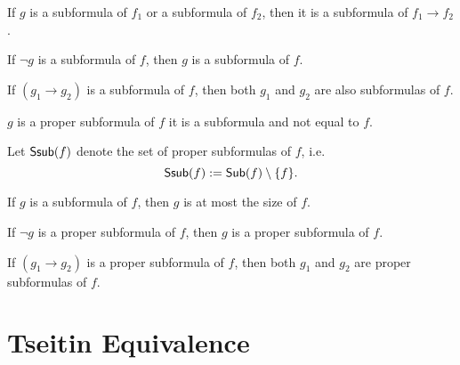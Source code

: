 \begin{lemma}
    \label{sub_imp}
    \leanok
    If $g$ is a subformula of $f_1$ or a subformula of $f_2$, then it is a subformula of $f_1 \to f_2$.
\end{lemma}

\begin{lemma}
    \label{neg_sub}
    If $\neg g$ is a subformula of $f$, then $g$ is a subformula of $f$.
\end{lemma}

\begin{lemma}
    \label{imp_sub}
    \leanok
    If $(g_1 \to g_2)$ is a subformula of $f$, then both $g_1$ and $g_2$ are also subformulas of $f$.
\end{lemma}

\begin{definition}
    \label{Ssub}
    \leanok
    $g$ is a proper subformula of $f$ it is a subformula and not equal to $f$.
    
    Let $\mathsf{Ssub}(f)$ denote the set of proper subformulas of $f$, i.e.\
    \[
    \mathsf{Ssub}(f) := \mathsf{Sub}(f) \setminus \{ f \}.
    \]
\end{definition}

\begin{lemma}
    \label{sub_smaller}
    \leanok
    If $g$ is a subformula of $f$, then $g$ is at most the size of $f$.
\end{lemma}

\begin{lemma}
    \label{neg_ssub}
    \leanok
    If $\neg g$ is a proper subformula of $f$, then $g$ is a proper subformula of $f$.
\end{lemma}

\begin{lemma}
    \label{imp_ssub}
    \leanok
    If $(g_1 \to g_2)$ is a proper subformula of $f$, then both $g_1$ and $g_2$ are proper subformulas of $f$.
\end{lemma}

\section{Tseitin Equivalence}

